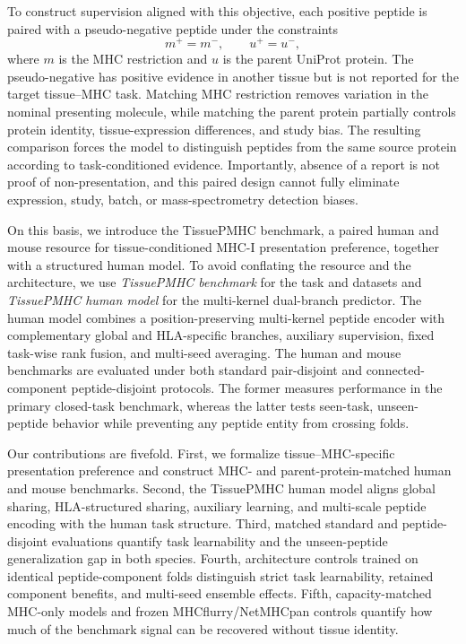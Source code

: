 To construct supervision aligned with this objective, each positive peptide is paired with a pseudo-negative peptide under the constraints
\[
m^{+}=m^{-}, \qquad u^{+}=u^{-},
\]
where \(m\) is the MHC restriction and \(u\) is the parent UniProt protein. The pseudo-negative has positive evidence in another tissue but is not reported for the target tissue--MHC task. Matching MHC restriction removes variation in the nominal presenting molecule, while matching the parent protein partially controls protein identity, tissue-expression differences, and study bias. The resulting comparison forces the model to distinguish peptides from the same source protein according to task-conditioned evidence. Importantly, absence of a report is not proof of non-presentation, and this paired design cannot fully eliminate expression, study, batch, or mass-spectrometry detection biases.

On this basis, we introduce the TissuePMHC benchmark, a paired human and mouse resource for tissue-conditioned MHC-I presentation preference, together with a structured human model. To avoid conflating the resource and the architecture, we use \emph{TissuePMHC benchmark} for the task and datasets and \emph{TissuePMHC human model} for the multi-kernel dual-branch predictor. The human model combines a position-preserving multi-kernel peptide encoder with complementary global and HLA-specific branches, auxiliary supervision, fixed task-wise rank fusion, and multi-seed averaging. The human and mouse benchmarks are evaluated under both standard pair-disjoint and connected-component peptide-disjoint protocols. The former measures performance in the primary closed-task benchmark, whereas the latter tests seen-task, unseen-peptide behavior while preventing any peptide entity from crossing folds.

Our contributions are fivefold. First, we formalize tissue--MHC-specific presentation preference and construct MHC- and parent-protein-matched human and mouse benchmarks. Second, the TissuePMHC human model aligns global sharing, HLA-structured sharing, auxiliary learning, and multi-scale peptide encoding with the human task structure. Third, matched standard and peptide-disjoint evaluations quantify task learnability and the unseen-peptide generalization gap in both species. Fourth, architecture controls trained on identical peptide-component folds distinguish strict task learnability, retained component benefits, and multi-seed ensemble effects. Fifth, capacity-matched MHC-only models and frozen MHCflurry/NetMHCpan controls quantify how much of the benchmark signal can be recovered without tissue identity.

